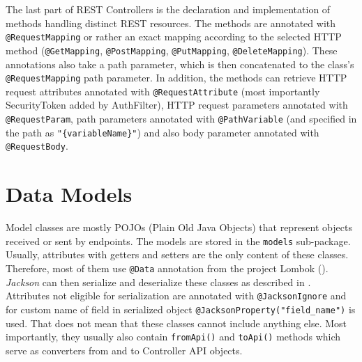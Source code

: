 The last part of REST Controllers is the declaration and implementation of methods handling distinct REST resources. The methods are annotated with \texttt{@RequestMapping} or rather an exact mapping according to the selected HTTP method (\texttt{@GetMapping}, \texttt{@PostMapping}, \texttt{@PutMapping}, \texttt{@DeleteMapping}).
These annotations also take a path parameter, which is then concatenated to the class’s \texttt{@RequestMapping} path parameter.
In addition, the methods can retrieve HTTP request attributes annotated with \texttt{@RequestAttribute} (most importantly SecurityToken added by AuthFilter), HTTP request parameters annotated with \texttt{@RequestParam}, path parameters annotated with \texttt{@PathVariable} (and specified in the path as \texttt{"\{variableName\}"}) and also body parameter annotated with \texttt{@RequestBody}.



\section{Data Models}
Model classes are mostly POJOs (Plain Old Java Objects) that represent objects received or sent by endpoints. The models are stored in the \texttt{models} sub-package. Usually, attributes with getters and setters are the only content of these classes. Therefore, most of them use \texttt{@Data} annotation from the project Lombok ().
\emph{Jackson} can then serialize and deserialize these classes as described in . Attributes not eligible for serialization are annotated with \texttt{@JacksonIgnore} and for custom name of field in serialized object \texttt{@JacksonProperty("field\_name")} is used.
That does not mean that these classes cannot include anything else. Most importantly, they usually also contain \texttt{fromApi()} and \texttt{toApi()} methods which serve as converters from and to Controller API objects.

